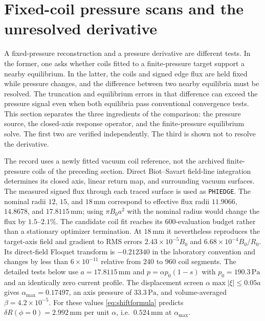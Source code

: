 \section{Fixed-coil pressure scans and the unresolved derivative}
\label{sec:scanstatus}
A fixed-pressure reconstruction and a pressure derivative are different tests. In the former, one asks whether coils fitted to a finite-pressure target support a nearby equilibrium. In the latter, the coils and signed edge flux are held fixed while pressure changes, and the difference between two nearby equilibria must be resolved. The truncation and equilibrium errors in that difference can exceed the pressure signal even when both equilibria pass conventional convergence tests. This section separates the three ingredients of the comparison: the pressure source, the closed-axis response operator, and the finite-pressure equilibrium solve. The first two are verified independently. The third is shown not to resolve the derivative.

The record uses a newly fitted vacuum coil reference, not the archived finite-pressure coils of the preceding section. Direct Biot--Savart field-line integration determines its closed axis, linear return map, and surrounding vacuum surfaces. The measured signed flux through each traced surface is used as \texttt{PHIEDGE}. The nominal radii $12$, $15$, and $18\,\mathrm{mm}$ correspond to effective flux radii $11.9066$, $14.8678$, and $17.8115\,\mathrm{mm}$; using $\pi B_0a^2$ with the nominal radius would change the flux by $1.5$--$2.1\%$. The candidate coil fit reaches its 600-evaluation budget rather than a stationary optimizer termination. At $18\,\mathrm{mm}$ it nevertheless reproduces the target-axis field and gradient to RMS errors $2.43\times10^{-5}B_0$ and $6.68\times10^{-4}B_0/R_0$. Its direct-field Floquet transform is $-0.212340$ in the laboratory convention and changes by less than $6\times10^{-11}$ relative from 240 to 960 coil segments. The detailed tests below use $a=17.8115\,\mathrm{mm}$ and $p=\alpha p_0(1-s)$ with $p_0=190.3\,\mathrm{Pa}$ and an identically zero current profile. The displacement screen $\alpha\max|\xi|\le0.05a$ gives $\alpha_{\max}=0.17497$, an axis pressure of $33.3\,\mathrm{Pa}$, and volume-averaged $\beta=4.2\times10^{-5}$. For these values \eqref{eq:shiftformula} predicts $\delta R(\phi=0)=2.992\,\mathrm{mm}$ per unit $\alpha$, i.e.\ $0.524\,\mathrm{mm}$ at $\alpha_{\max}$.

